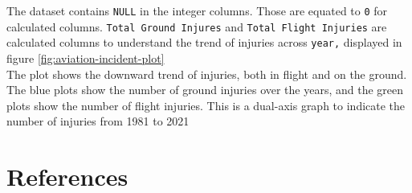 \documentclass[
  man,floatsintext]{apa7}
\begin{document}
The dataset contains \texttt{NULL} in the integer columns. Those are equated to \texttt{0} for calculated columns. \texttt{Total\ Ground\ Injures} and \texttt{Total\ Flight\ Injuries} are calculated columns to understand the trend of injuries across \texttt{year,} displayed in figure \ref{fig:aviation-incident-plot}\\

The plot shows the downward trend of injuries, both in flight and on the ground. The blue plots show the number of ground injuries over the years, and the green plots show the number of flight injuries. This is a dual-axis graph to indicate the number of injuries from 1981 to 2021\\

\newpage

\hypertarget{references}{%
\section{References}\label{references}}

\begingroup
\setlength{\parindent}{-0.5in}
\setlength{\leftskip}{0.5in}
\end{document}
